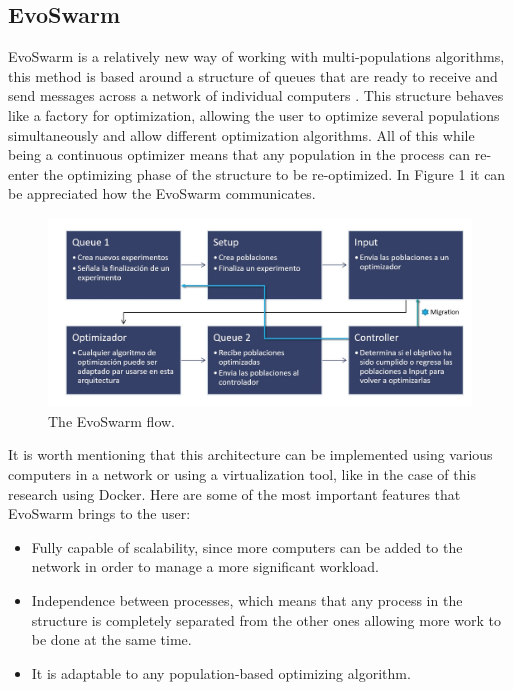 \documentclass[runningheads]{llncs}
\begin{document}
\subsection{EvoSwarm}

EvoSwarm is a relatively new way of working with multi-populations algorithms, this method is based around a structure of queues that are ready to receive and send messages across a network of individual computers \cite{b18}. This structure behaves like a factory for optimization, allowing the user to optimize several populations simultaneously and allow different optimization algorithms. All of this while being a continuous optimizer means that any population in the process can re-enter the optimizing phase of the structure to be re-optimized. In Figure 1 it can be appreciated how the EvoSwarm communicates.

\begin{figure}[h]
\centering
{}
\includegraphics[scale=.40]{Resources/F1-1.jpg}
\caption{The EvoSwarm flow.}
\label{fig:example}
\end{figure}

It is worth mentioning that this architecture can be implemented using various computers in a network or using a virtualization tool, like in the case of this research using Docker. Here are some of the most important features that EvoSwarm brings to the user:

\begin{itemize}
    \item Fully capable of scalability, since more computers can be added to the network in order to manage a more significant workload.
    \item Independence between processes, which means that any process in the structure is completely separated from the other ones allowing more work to be done at the same time.
    \item It is adaptable to any population-based optimizing algorithm.
\end{itemize}
\end{document}
